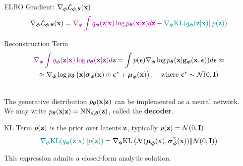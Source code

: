 \documentclass{beamer}
\renewcommand{\eqpause}{}
\begin{document}
\begin{frame}{ELBO Gradient: $\nabla_{\bphi} \cL_{\bphi, \btheta}(\bx)$}
	\vspace{-0.3cm}
	\[
		\nabla_{\bphi} \cL_{\bphi, \btheta}(\bx) = {\color{violet}\nabla_{\bphi} \int q_{\bphi}(\bz| \bx)\log \pt(\bx | \bz) d \bz} - {\color{teal}\nabla_{\bphi} \KL(q_{\bphi}(\bz| \bx) \| p(\bz))}
	\]
	\eqpause
	\vspace{-0.3cm}
	\begin{block}{Reconstruction Term}
		\vspace{-0.7cm}
		\begin{multline*}
			 {\color{violet}\nabla_{\bphi} \int q_{\bphi}(\bz| \bx)\log \pt(\bx | \bz) d \bz} = \int p(\bepsilon) \nabla_{\bphi} \log \pt(\bx | \bg_{\bphi}(\bx, \bepsilon)) d\bepsilon \approx \\
			 \approx \nabla_{\bphi} \log \pt\left(\bx | \bsigma_{\bphi}(\bx) \odot \bepsilon^* + \bmu_{\bphi}(\bx)\right), \quad \text{where } \bepsilon^* \sim \cN(0, \bI)
		\end{multline*}
		\eqpause
		\vspace{-0.5cm} \\
		The generative distribution $\pt(\bx | \bz)$ can be implemented as a neural network. \\
		We may write $\pt(\bx | \bz) = \text{NN}_{d, \btheta}(\bz)$, called the \textbf{decoder}.
	\end{block}
	\eqpause
	\begin{block}{KL Term}
		$p(\bz)$ is the prior over latents $\bz$, typically $p(\bz) = \cN (0, \bI)$.
		\[
			{\color{teal}\nabla_{\bphi} \KL(q_{\bphi}(\bz| \bx) \| p(\bz))} = \nabla_{\bphi} \KL\left( \cN (\bmu_{\bphi}(\bx), \bsigma^2_{\bphi}(\bx)) \| \cN (0, \bI) \right)
		\]
		\eqpause
		This expression admits a closed-form analytic solution.
	\end{block}
\end{frame}
\end{document}
